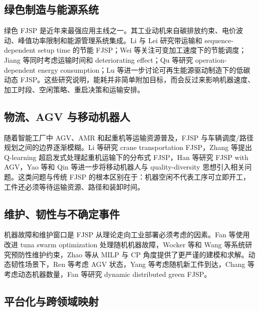 \documentclass[UTF8,a4paper,11pt]{ctexart}
\begin{document}
\subsection{绿色制造与能源系统}

绿色 FJSP 是近年来最强应用主线之一。其工业动机来自碳排放约束、电价波动、峰值功率限制和能源管理系统集成。Li 与 Lei 研究带运输和 sequence-dependent setup time 的节能 FJSP\cite{Li2021EnergyTransport}；Wei 等关注可变加工速度下的节能调度\cite{Wei2022EnergySpeed}；Jiang 等同时考虑运输时间和 deteriorating effect\cite{Jiang2022Deterioration}；Qu 等研究 operation-dependent energy consumption\cite{Qu2024OperationEnergy}；Lu 等进一步讨论可再生能源驱动制造下的低碳动态 FJSP\cite{Lu2026Renewable}。这些研究说明，能耗并非简单附加目标，而会反过来影响机器速度、加工时段、空闲策略、重启决策和运输安排。

\subsection{物流、AGV 与移动机器人}

随着智能工厂中 AGV、AMR 和起重机等运输资源普及，FJSP 与车辆调度/路径规划之间的边界逐渐模糊。Li 等研究 crane transportation FJSP\cite{Li2022Crane}，Zhang 等提出 Q-learning 超启发式处理起重机运输下的分布式 FJSP\cite{Zhang2023CraneQL}，Han 等研究 FJSP with AGV\cite{Han2024AGV}，Yao 等和 Qin 等进一步将移动机器人与 quality-diversity 思想引入相关问题\cite{Yao2024MobileRobots,Qin2025QD,Qin2026QDReal}。这类问题与传统 FJSP 的根本区别在于：机器空闲不代表工序可立即开工，工件还必须等待运输资源、路径和装卸时间。

\subsection{维护、韧性与不确定事件}

机器故障和维护窗口是 FJSP 从理论走向工业部署必须考虑的因素。Fan 等使用改进 tuna swarm optimization 处理随机机器故障\cite{Fan2024Breakdown}，Wocker 等和 Wang 等系统研究预防性维护约束\cite{Wocker2024PM,Wang2024PM}，Zhao 等从 MILP 与 CP 角度提供了更严谨的建模和求解\cite{Zhao2025MILPPM,Zhao2025CPPM}。动态韧性场景下，Ren 等考虑 AGV 状态，Yang 等考虑随机新工件到达，Chang 等考虑动态机器数量，Fan 等研究 dynamic distributed green FJSP\cite{Ren2024AGVStates,Yang2025RandomArrival,Chang2024DynamicMachines,Fan2025DynamicGreen}。

\subsection{平台化与跨领域映射}
\end{document}
